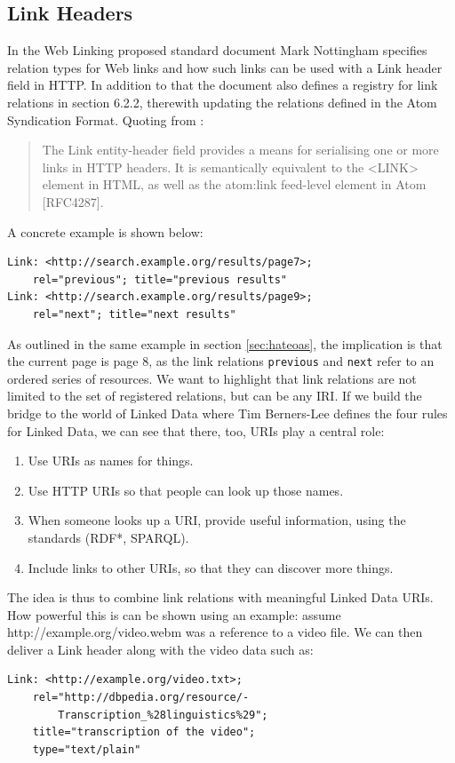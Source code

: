 \documentclass{acm_proc_article-sp}
\begin{document}
\subsection{Link Headers}\label{sec:linkheaders}
In the Web Linking\cite{Link:Headers} proposed standard document Mark Nottingham specifies relation types for Web links and how such links can be used with a Link header field in HTTP. In addition to that the document also defines a registry for link relations in section 6.2.2, therewith updating the relations defined in the Atom Syndication Format. Quoting from \cite{Link:Headers}:
\begin{quote}
The Link entity-header field provides a means for serialising one or more links in HTTP headers.  It is semantically equivalent to the <LINK> element in HTML, as well as the atom:link feed-level element in Atom [RFC4287].
\end{quote}
A concrete example is shown below:
\begin{verbatim}
Link: <http://search.example.org/results/page7>;
    rel="previous"; title="previous results"
Link: <http://search.example.org/results/page9>;
    rel="next"; title="next results"
\end{verbatim}
As outlined in the same example in section \ref{sec:hateoas}, the implication is that the current page is page 8, as the link relations \texttt{previous} and \texttt{next} refer to an ordered series of resources. We want to highlight that link relations are not limited to the set of registered relations, but can be any IRI. If we build the bridge to the world of Linked Data\cite{TimBL:LinkedData} where Tim Berners-Lee defines the four rules for Linked Data, we can see that there, too, URIs play a central role:
\begin{enumerate}
\item Use URIs as names for things.
\item Use HTTP URIs so that people can look up those names.
\item When someone looks up a URI, provide useful information, using the standards (RDF*, SPARQL).
\item Include links to other URIs, so that they can discover more things.
\end{enumerate}
The idea is thus to combine link relations with meaningful Linked Data URIs. How powerful this is can be shown using an example: assume http://example.org/video.webm was a reference to a video file. We can then deliver a Link header along with the video data such as:
\begin{verbatim}
Link: <http://example.org/video.txt>;
    rel="http://dbpedia.org/resource/-
        Transcription_%28linguistics%29";
    title="transcription of the video";
    type="text/plain"
\end{verbatim}
\end{document}
